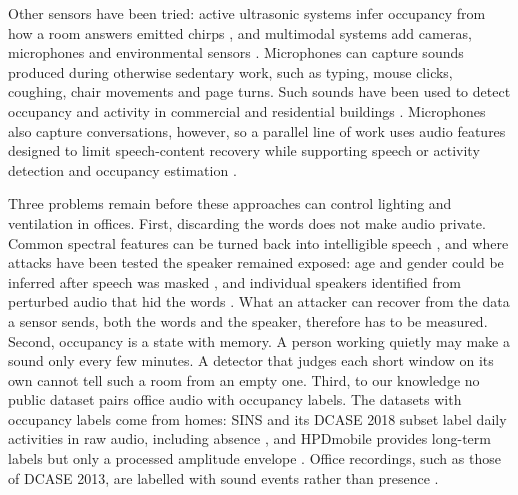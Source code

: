 \documentclass[11pt]{article}
\begin{document}
Other sensors have been tried: active ultrasonic systems infer occupancy from how a room answers emitted chirps \citep{shih2015chirps,shih2016aures}, and multimodal systems add cameras, microphones and environmental sensors \citep{jacoby2021hpdmobile,tan2022fusion}. Microphones can capture sounds produced during otherwise sedentary work, such as typing, mouse clicks, coughing, chair movements and page turns. Such sounds have been used to detect occupancy and activity in commercial and residential buildings \citep{ghaffarzadegan2017occupancy,valle2016abroa,santiago2021audio}. Microphones also capture conversations, however, so a parallel line of work uses audio features designed to limit speech-content recovery while supporting speech or activity detection \citep{wyatt2007conversation,parthasarathi2009privacy,parthasarathi2011privacy} and occupancy estimation \citep{alhossain2023crowdotic,williams2023privacy}.

Three problems remain before these approaches can control lighting and ventilation in offices. First, discarding the words does not make audio private. Common spectral features can be turned back into intelligible speech \citep{milner2002reconstruction,shao2005f0}, and where attacks have been tested the speaker remained exposed: age and gender could be inferred after speech was masked \citep{chhaglani2025featuresense}, and individual speakers identified from perturbed audio that hid the words \citep{williams2023privacy}. What an attacker can recover from the data a sensor sends, both the words and the speaker, therefore has to be measured. Second, occupancy is a state with memory. A person working quietly may make a sound only every few minutes. A detector that judges each short window on its own cannot tell such a room from an empty one. Third, to our knowledge no public dataset pairs office audio with occupancy labels. The datasets with occupancy labels come from homes: SINS and its DCASE 2018 subset label daily activities in raw audio, including absence \citep{dekkers2017sins,dekkers2018dcase}, and HPDmobile provides long-term labels but only a processed amplitude envelope \citep{jacoby2021hpdmobile}. Office recordings, such as those of DCASE 2013, are labelled with sound events rather than presence \citep{stowell2015dcase}.
\end{document}
